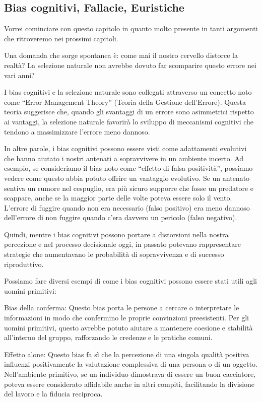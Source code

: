 \documentclass[12pt]{book} %
\begin{document}
\subsection{Bias cognitivi, Fallacie, Euristiche}
Vorrei cominciare con questo capitolo in quanto molto presente in tanti argomenti che ritroveremo nei prossimi capitoli.


Una domanda che sorge spontanea è: come mai il nostro cervello distorce la realtà? La selezione naturale non avrebbe
dovuto far scomparire questo errore nei vari anni?

I bias cognitivi e la selezione naturale sono collegati attraverso un concetto noto come “Error Management Theory”
(Teoria della Gestione dell'Errore). Questa teoria suggerisce che, quando gli svantaggi di un
errore sono asimmetrici rispetto ai vantaggi, la selezione naturale favorirà lo sviluppo di meccanismi cognitivi che
tendono a massimizzare l'errore meno dannoso.

In altre parole, i bias cognitivi possono essere visti come adattamenti evolutivi che hanno aiutato i nostri antenati a
sopravvivere in un ambiente incerto. Ad esempio, se consideriamo il bias noto come “effetto di falsa positività”,
possiamo vedere come questo abbia potuto offrire un vantaggio evolutivo. Se un antenato sentiva un rumore nel
cespuglio, era più sicuro supporre che fosse un predatore e scappare, anche se la maggior parte delle volte poteva
essere solo il vento. L'errore di fuggire quando non era necessario (falso positivo) era meno
dannoso dell'errore di non fuggire quando c'era davvero un pericolo (falso
negativo).

Quindi, mentre i bias cognitivi possono portare a distorsioni nella nostra percezione e nel processo decisionale oggi,
in passato potevano rappresentare strategie che aumentavano le probabilità di sopravvivenza e di successo riproduttivo.


Possiamo fare diversi esempi di come i bias cognitivi possono essere stati utili agli uomini primitivi:

Bias della conferma: Questo bias porta le persone a cercare o interpretare le informazioni in modo che confermino le
proprie convinzioni preesistenti. Per gli uomini primitivi, questo avrebbe potuto aiutare a mantenere coesione e
stabilità all'interno del gruppo, rafforzando le credenze e le pratiche comuni.

Effetto alone: Questo bias fa sì che la percezione di una singola qualità positiva influenzi positivamente la
valutazione complessiva di una persona o di un oggetto. Nell'ambiente primitivo, se un individuo
dimostrava di essere un buon cacciatore, poteva essere considerato affidabile anche in altri compiti, facilitando la
divisione del lavoro e la fiducia reciproca.
\end{document}
